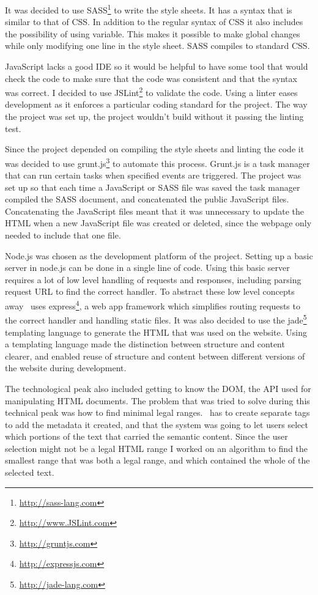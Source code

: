 It was decided to use SASS\footnote{\url{http://sass-lang.com}} to write the style sheets.
It has a syntax that is similar to that of CSS.
In addition to the regular syntax of CSS it also includes the possibility of using variable.
This makes it possible to make global changes while only modifying one line in the style sheet.
SASS compiles to standard CSS.

JavaScript lacks a good IDE so it would be helpful to have some tool that would check the code to make sure that the
code was consistent and that the syntax was correct.
I decided to use JSLint\footnote{\url{http://www.JSLint.com}} to validate the code.
Using a linter eases development as it enforces a particular coding standard for the project.
The way the project was set up, the project wouldn't build without it passing the linting test.

Since the project depended on compiling the style sheets and linting the code it was decided to use grunt.js\footnote{\url{http://gruntjs.com}}
to automate this process.
Grunt.js is a task manager that can run certain tasks when specified events are triggered.
The project was set up so that each time a JavaScript or SASS file was saved the task manager compiled the SASS document,
and concatenated the public JavaScript files.
Concatenating the JavaScript files meant that it was unnecessary to update the HTML when a new JavaScript file was created or deleted,
since the webpage only needed to include that one file.

Node.js was chosen as the development platform of the project.
Setting up a basic server in node.js can be done in a single line of code.
Using this basic server requires a lot of low level handling of requests and responses,
including parsing request URL to find the correct handler.
To abstract these low level concepts away \theartefact\ uses express\footnote{\url{http://expressjs.com}},
a web app framework which simplifies routing requests to the correct handler and handling static files.
It was also decided to use the jade\footnote{\url{http://jade-lang.com}}
templating language to generate the HTML that was used on the website.
Using a templating language made the distinction between structure and content clearer,
and enabled reuse of structure and content between different versions of the website during development.

The technological peak also included getting to know the DOM, the API used for manipulating HTML documents.
The problem that was tried to solve during this technical peak was how to find minimal legal ranges.
\Theartefact\ has to create separate tags to add the metadata it created,
and that the system was going to let users select which portions of the text that carried the semantic content.
Since the user selection might not be a legal HTML range I worked on an algorithm to find the smallest range that
was both a legal range, and which contained the whole of the selected text.


